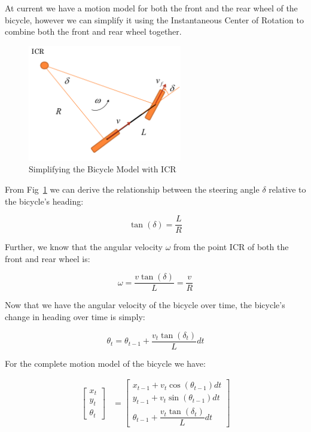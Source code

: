 \documentclass{article}
\begin{document}
At current we have a motion model for both the front and the rear wheel of the bicycle, however we can simplify it using the Instantaneous Center of Rotation to combine both the front and rear wheel together.

\begin{figure}[H]
	\centering
	\includegraphics[width=0.6\textwidth]{images/bicycle_icr.png}
	\caption{Simplifying the Bicycle Model with ICR}
	\label{fig:bicycle_icr}
\end{figure}

From Fig~\ref{fig:bicycle_icr} we can derive the relationship between the steering angle $\delta$ relative to the bicycle's heading:

\begin{equation}
	\label{eq:icr_steering_angle}
	\tan(\delta) = \dfrac{L}{R}
\end{equation}

Further, we know that the angular velocity $\omega$ from the point ICR of both the front and rear wheel is:

\begin{equation}
	\label{eq:icr_angluar_velocity}
	\omega = \dfrac{v \tan(\delta)}{L} = \dfrac{v}{R}
\end{equation}

Now that we have the angular velocity of the bicycle over time, the bicycle's change in heading over time is simply:

\begin{equation}
	\theta_{t} = \theta_{t - 1} + \dfrac{v_{t} \tan(\delta_{t})}{L} dt
\end{equation}

For the complete motion model of the bicycle we have:

\begin{align}
 	\begin{bmatrix}
        x_{t} \\
        y_{t} \\
        \theta_{t}
    \end{bmatrix}  
    &=
    \begin{bmatrix}
	    x_{t - 1} + v_{t} \cos(\theta_{t - 1}) dt \\
		y_{t - 1} + v_{t} \sin(\theta_{t - 1}) dt \\
		\theta_{t - 1} + \dfrac{v_{t} \tan(\delta_{t})}{L} dt
    \end{bmatrix}
\end{align}
\end{document}
